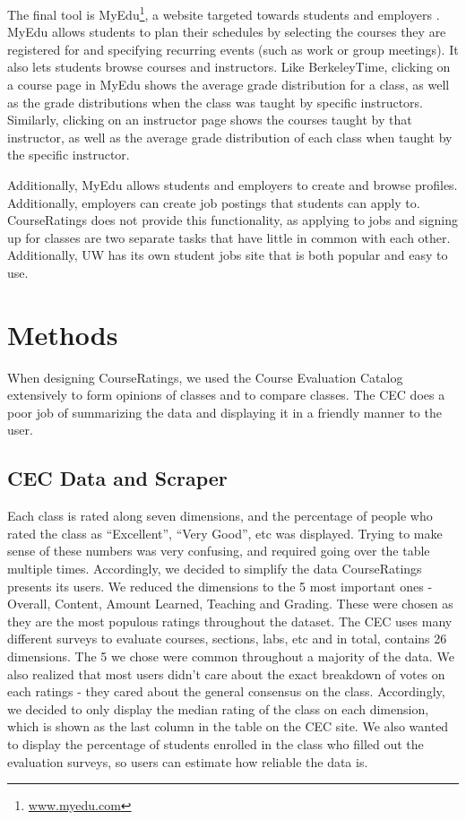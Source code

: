 \documentclass{chi2009}
\begin{document}
The final tool is MyEdu\footnote{\href{www.myedu.com}{www.myedu.com}}, a website targeted towards students and employers \cite{myedu}. MyEdu allows students to plan their schedules by selecting the courses they are registered for and specifying recurring events (such as work or group meetings). It also lets students browse courses and instructors. Like BerkeleyTime, clicking on a course page in MyEdu shows the average grade distribution for a class, as well as the grade distributions when the class was taught by specific instructors. Similarly, clicking on an instructor page shows the courses taught by that instructor, as well as the average grade distribution of each class when taught by the specific instructor.

Additionally, MyEdu allows students and employers to create and browse profiles. Additionally, employers can create job postings that students can apply to. CourseRatings does not provide this functionality, as applying to jobs and signing up for classes are two separate tasks that have little in common with each other. Additionally, UW has its own student jobs site that is both popular and easy to use.

\section{Methods}

When designing CourseRatings, we used the Course Evaluation Catalog extensively to form opinions of classes and to compare classes. The CEC does a poor job of summarizing the data and displaying it in a friendly manner to the user.

\subsection{CEC Data and Scraper}
Each class is rated along seven dimensions, and the percentage of people who rated the class as ``Excellent'', ``Very Good'', etc was displayed. Trying to make sense of these numbers was very confusing, and required going over the table multiple times. Accordingly, we decided to simplify the data CourseRatings presents its users. We reduced the dimensions to the 5 most important ones - Overall, Content, Amount Learned, Teaching and Grading. These were chosen as they are the most populous ratings throughout the dataset. The CEC uses many different surveys to evaluate courses, sections, labs, etc and in total, contains 26 dimensions. The 5 we chose were common throughout a majority of the data. We also realized that most users didn't care about the exact breakdown of votes on each ratings - they cared about the general consensus on the class. Accordingly, we decided to only display the median rating of the class on each dimension, which is shown as the last column in the table on the CEC site. We also wanted to display the percentage of students enrolled in the class who filled out the evaluation surveys, so users can estimate how reliable the data is.
\end{document}
